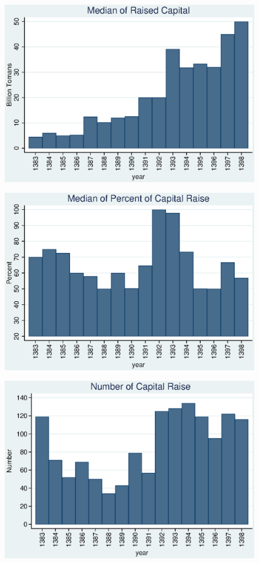 \documentclass[12pt]{article}
\begin{document}
\begin{figure}
\centering
\includegraphics[width=0.7\linewidth]{MedianCapRaise.eps}
\caption{}
\label{fig:mediancapraise}
\end{figure}

\begin{figure}
\centering
\includegraphics[width=0.7\linewidth]{MedianPercent.eps}
\caption{}
\label{fig:medianpercent}
\end{figure}

\begin{figure}
\centering
\includegraphics[width=0.7\linewidth]{Number.eps}
\caption{}
\label{fig:number}
\end{figure}
\end{document}
